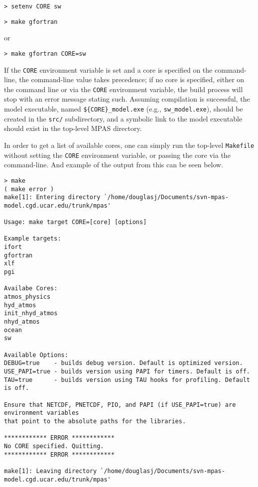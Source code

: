 \vspace{12pt}
{\tt > setenv CORE sw}

{\tt > make gfortran}
\vspace{12pt}

\noindent or

\vspace{12pt}
{\tt > make gfortran CORE=sw}
\vspace{12pt}

If the {\tt CORE} environment variable is set and a core is specified on the command-line, the command-line value takes precedence; if no core
is specified, either on the command line or via the {\tt CORE} environment variable, the build process will stop with an error message stating such.
Assuming compilation is successful, the model executable, named {\tt \$\{CORE\}\_model.exe} (e.g., {\tt sw\_model.exe}), should
be created in the {\tt src/} subdirectory, and a symbolic link to the model executable 
should exist in the top-level MPAS directory.

In order to get a list of available cores, one can simply run the top-level {\tt Makefile} without setting the {\tt CORE} environment variable, or passing the core via the command-line. And example of the output from this can be seen below.

{\small
\begin{verbatim}
> make
( make error )
make[1]: Entering directory `/home/douglasj/Documents/svn-mpas-model.cgd.ucar.edu/trunk/mpas'

Usage: make target CORE=[core] [options]

Example targets:
ifort
gfortran
xlf
pgi

Availabe Cores:
atmos_physics
hyd_atmos
init_nhyd_atmos
nhyd_atmos
ocean
sw

Available Options:
DEBUG=true    - builds debug version. Default is optimized version.
USE_PAPI=true - builds version using PAPI for timers. Default is off.
TAU=true      - builds version using TAU hooks for profiling. Default is off.

Ensure that NETCDF, PNETCDF, PIO, and PAPI (if USE_PAPI=true) are environment variables
that point to the absolute paths for the libraries.

************ ERROR ************
No CORE specified. Quitting.
************ ERROR ************

make[1]: Leaving directory `/home/douglasj/Documents/svn-mpas-model.cgd.ucar.edu/trunk/mpas'
\end{verbatim}
}

